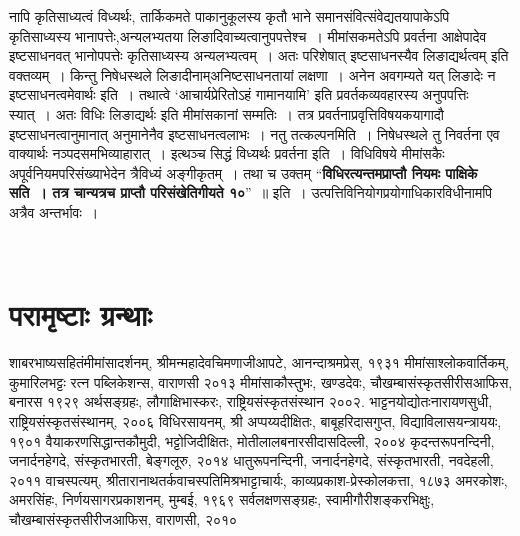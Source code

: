 {नापि कृतिसाध्यत्वं विध्यर्थः, तार्किकमते पाकानुकूलस्य कृतौ भाने समानसंवित्संवेद्य\-तयापाकेऽपि कृतिसाध्यस्य भानापत्तेः,अन्यलभ्यतया लिङादिवाच्यत्वानुपपत्तेश्च~। मीमांस\-कमतेऽपि प्रवर्तना आक्षेपादेव इष्टसाधनवत् भानोपपत्तेः कृतिसाध्यस्य अन्यलभ्यत्वम्~। अतः परिशेषात्  इष्टसाधनस्यैव लिङाद्यर्थत्वम् इति वक्तव्यम्~। किन्तु निषेधस्थले लिङादीनाम्\break अनिष्टसाधनतायां लक्षणा~। अनेन अवगम्यते यत् लिङादेः न इष्टसाधनत्वमेवार्थः इति~। तथात्वे ‘आचार्यप्रेरितोऽहं गामानयामि’ इति प्रवर्तकव्यवहारस्य अनुपपत्तिः स्यात्~। अतः विधिः लिङाद्यर्थः इति मीमांसकानां सम्मतिः~। तत्र प्रवर्तनाप्रवृत्तिविषयकयागादौ इष्टसाधनत्वानुमानात् अनुमानेनैव इष्टसाधनत्वलाभः~। नतु तत्कल्पनमिति~। निषेधस्थले तु निवर्तना एव वाक्यार्थः नञ्पदसमभिव्याहारात्~। इत्थञ्च सिद्धं विध्यर्थः प्रवर्तना इति~।  विधिविषये \-मीमांसकैः अपूर्वनियमपरिसंख्याभेदेन त्रैविध्यं अङ्गीकृतम्~। तथा च उक्तम् “\textbf{विधिरत्यन्तमप्राप्तौ \-नियमः पाक्षिके सति~। तत्र चान्यत्रच प्राप्तौ परिसंखेतिगीयते १०}”~॥ इति~। उत्पत्तिविनियोगप्रयोगाधिकारविधीनामपि अत्रैव अन्तर्भावः~। 

~\\[-1cm]

\section*{परामृष्टाः ग्रन्थाः}
\vskip -1cm

\begin{thebibliography}{99}
 शाबरभाष्यसहितंमीमांसादर्शनम्, श्रीमन्महादेवचिमणाजीआपटे, आनन्दाश्रमप्रेस्, १९३१
 मीमांसाश्लोकवार्तिकम्, कुमारिलभट्टः रत्न पब्लिकेशन्स, वाराणसी २०१३
 मीमांसाकौस्तुभः, खण्डदेवः, चौखम्बासंस्कृतसीरीसआफिस, बनारस १९२९
 अर्थसङ्ग्रहः, लौगाक्षिभास्करः, राष्ट्रियसंस्कृतसंस्थान २००२.
 भाट्टनयोद्योतःनारायणसुधी, राष्ट्रियसंस्कृतसंस्थानम्, २००६
 विधिरसायनम्, श्री अप्पय्यदीक्षितः, बाबूहरिदासगुप्त, विद्याविलासयन्त्राययः, १९०१
 वैयाकरणसिद्धान्तकौमुदी, भट्टोजिदीक्षितः, मोतीलालबनारसीदासदिल्ली, २००४
 कृदन्तरूपनन्दिनी, जनार्दनहेगदे, संस्कृतभारती, बेङ्गलूरु, २०१४
 धातुरूपनन्दिनी, जनार्दनहेगदे, संस्कृतभारती, नवदेहली, २०११
 वाचस्पत्यम्, श्रीतारानाथतर्कवाचस्पतिमिश्रभाट्टाचार्यः, काव्यप्रकाश-प्रेस्कोलकत्ता, १८७३
 अमरकोशः, अमरसिंहः, निर्णयसागरप्रकाशनम्, मुम्बई, १९६९
 सर्वलक्षणसङ्ग्रहः, स्वामीगौरीशङ्करभिक्षुः, चौखम्बासंस्कृतसीरीजआफिस, वाराणसी, २०१०
 {\fontsize{14}{16}\selectfont {}} 
 {\fontsize{14}{16}\selectfont {}} 
\end{thebibliography}

\articleend
}
